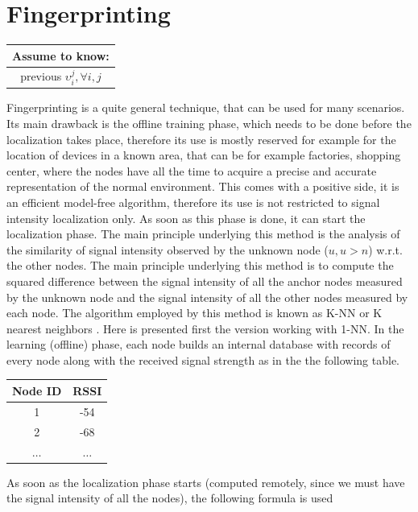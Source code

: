 \documentclass[12pt]{report}
\begin{document}
\section{Fingerprinting}
\begin{center}
    \begin{tabular}{ |c| }
    \hline
    \multicolumn{1}{|c|}{ \textbf{Assume to know:} } \\
    \hline
    previous $\upsilon_i^j,\forall i,j$\\
    \hline
    \end{tabular}
\end{center}
Fingerprinting \cite{YIU2017235} is a quite general technique, that can be used for many scenarios. Its main drawback is the offline training phase, which needs to be done before the localization takes place, therefore its use is mostly reserved for example for the location of devices in a known area, that can be for example factories, shopping center, where the nodes have all the time to acquire a precise and accurate representation of the normal environment. This comes with a positive side, it is an efficient model-free algorithm, therefore its use is not restricted to signal intensity localization only. As soon as this phase is done, it can start the localization phase. The main principle underlying this method is the analysis of the similarity of signal intensity observed by the unknown node ($u,u>n$) w.r.t. the other nodes. The main principle underlying this method is to compute the squared difference between the signal intensity of all the anchor nodes measured by the unknown node and the signal intensity of all the other nodes measured by each node.
The algorithm employed by this method is known as K-NN or K nearest neighbors \cite{10.5555/1162264}. Here is presented first the version working with 1-NN.
In the learning (offline) phase, each node builds an internal database with records of every node along with the received signal strength as in the the following table. 
\begin{center}
\begin{tabular}{ |c|c| } 
 \hline
 Node ID & RSSI\\ 
 \hline
 \hline
 1 & -54 \\ 
 2 & -68 \\
 $\hdots$ & $\hdots$\\
 \hline
\end{tabular}
\end{center}
As soon as the localization phase starts (computed remotely, since we must have the signal intensity of all the nodes), the following formula is used
\end{document}
